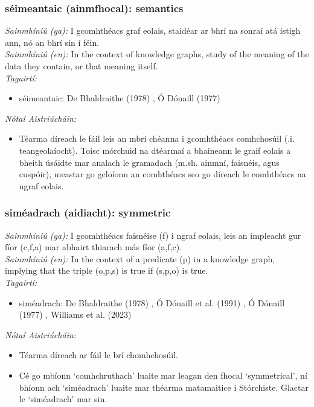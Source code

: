 \subsubsection*{séimeantaic (ainmfhocal): semantics}
 \noindent \textit{Sainmhíniú (ga):} I gcomhthéacs graf eolais, staidéar ar bhrí na sonraí atá istigh ann, nó an bhrí sin í féin.
\\
 \noindent \textit{Sainmhíniú (en):} In the context of knowledge graphs, study of the meaning of the data they contain, or that meaning itself.
\\
 \noindent \textit{Tagairtí:}
\begin{itemize}
	\item séimeantaic: De Bhaldraithe (1978) \cite{de-bhaldraithe}, Ó Dónaill (1977) \cite{odonaill}
\end{itemize}

 \noindent \textit{Nótaí Aistriúcháin:}
\begin{itemize}
	\item Téarma díreach le fáil leis an mbrí chéanna i gcomhthéacs comhchosúil (.i. teangeolaíocht). Toisc mórchuid na dtéarmaí a bhaineann le graif eolais a bheith úsáidte mar analach le gramadach (m.sh. ainmní, faisnéis, agus cuspóir), meastar go gcloíonn an comhthéacs seo go díreach le comhthéacs na ngraf eolais.
\end{itemize}


\subsubsection*{siméadrach (aidiacht): symmetric}
 \noindent \textit{Sainmhíniú (ga):} I gcomhthéacs faisnéise (f) i ngraf eolais, leis an impleacht gur fíor (c,f,a) mar abhairt thiarach más fíor (a,f,c).
\\
 \noindent \textit{Sainmhíniú (en):} In the context of a predicate (p) in a knowledge graph, implying that the triple (o,p,s) is true if (s,p,o) is true.
\\
 \noindent \textit{Tagairtí:}
\begin{itemize}
	\item siméadrach: De Bhaldraithe (1978) \cite{de-bhaldraithe}, Ó Dónaill et al. (1991) \cite{focloir-beag}, Ó Dónaill (1977) \cite{odonaill}, Williams et al. (2023) \cite{storchiste}
\end{itemize}

 \noindent \textit{Nótaí Aistriúcháin:}
\begin{itemize}
	\item Téarma díreach ar fáil le brí chomhchosúil.
	\item Cé go mbíonn `comhchruthach' luaite mar leagan den fhocal `symmetrical', ní bhíonn ach `siméadrach' luaite mar théarma matamaitice i Stórchiste. Glactar le `siméadrach' mar sin.
\end{itemize}


